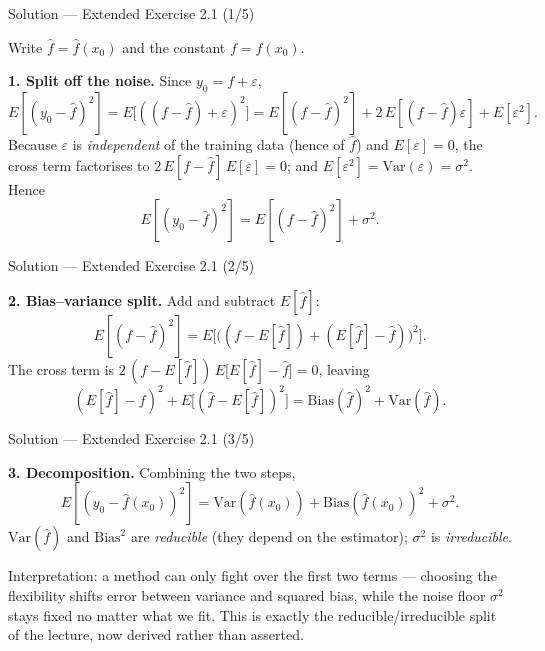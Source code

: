 \documentclass[aspectratio=169,11pt]{beamer}
\begin{document}
\begin{frame}{Solution --- Extended Exercise 2.1 (1/5)}
\begin{solutionbox}
Write $\hat f=\hat f(x_0)$ and the constant $f=f(x_0)$.

\textbf{1. Split off the noise.} Since $y_0=f+\varepsilon$,
\[
E[(y_0-\hat f)^2]=E\big[((f-\hat f)+\varepsilon)^2\big]
 =E[(f-\hat f)^2]+2\,E[(f-\hat f)\varepsilon]+E[\varepsilon^2].
\]
Because $\varepsilon$ is \emph{independent} of the training data (hence of $\hat f$) and $E[\varepsilon]=0$, the cross term factorises to $2\,E[f-\hat f]\,E[\varepsilon]=0$; and $E[\varepsilon^2]=\mathrm{Var}(\varepsilon)=\sigma^2$. Hence
\[
E[(y_0-\hat f)^2]=E[(f-\hat f)^2]+\sigma^2 .
\]
\end{solutionbox}
\end{frame}

\begin{frame}{Solution --- Extended Exercise 2.1 (2/5)}
\begin{solutionbox}
\textbf{2. Bias--variance split.} Add and subtract $E[\hat f]$:
\[
E[(f-\hat f)^2]=E\big[\big((f-E[\hat f])+(E[\hat f]-\hat f)\big)^2\big].
\]
The cross term is $2\,(f-E[\hat f])\,E\big[E[\hat f]-\hat f\big]=0$, leaving
\[
(E[\hat f]-f)^2+E\big[(\hat f-E[\hat f])^2\big]=\mathrm{Bias}(\hat f)^2+\mathrm{Var}(\hat f).
\]
\end{solutionbox}
\end{frame}

\begin{frame}{Solution --- Extended Exercise 2.1 (3/5)}
\begin{solutionbox}
\textbf{3. Decomposition.} Combining the two steps,
\[
\boxed{\,E[(y_0-\hat f(x_0))^2]=\mathrm{Var}(\hat f(x_0))+\mathrm{Bias}(\hat f(x_0))^2+\sigma^2 .\,}
\]
$\mathrm{Var}(\hat f)$ and $\mathrm{Bias}^2$ are \emph{reducible} (they depend on the estimator); $\sigma^2$ is \emph{irreducible}.

Interpretation: a method can only fight over the first two terms ---
choosing the flexibility shifts error between variance and squared
bias, while the noise floor $\sigma^2$ stays fixed no matter what we
fit. This is exactly the reducible/irreducible split of the lecture,
now derived rather than asserted.
\end{solutionbox}
\end{frame}
\end{document}
